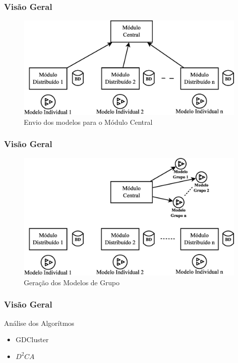 \documentclass[hyperref={pdfpagelabels=false}]{beamer}
\begin{document}
\begin{frame}
	\frametitle{Visão Geral}
    \begin{figure}
		\centering
	    \includegraphics[scale=0.30]{img/VisaoGeral-02}
  		\caption{\scriptsize{Envio dos modelos para o Módulo Central}}
   	\end{figure}
\end{frame}

\begin{frame}
	\frametitle{Visão Geral}
    \begin{figure}
		\centering
	    \includegraphics[scale=0.30]{img/VisaoGeral-03}
  		\caption{\scriptsize{Geração dos Modelos de Grupo}}
   	\end{figure}
\end{frame}

\begin{frame}
	\frametitle{Visão Geral}
    \Large Análise dos Algorítmos
    \linebreak
    
	\begin{itemize}
	    \item GDCluster \cite{001-000}
        \item $D^{2}CA$ \cite{017-000} 
    \end{itemize}
    
\end{frame}
\end{document}
